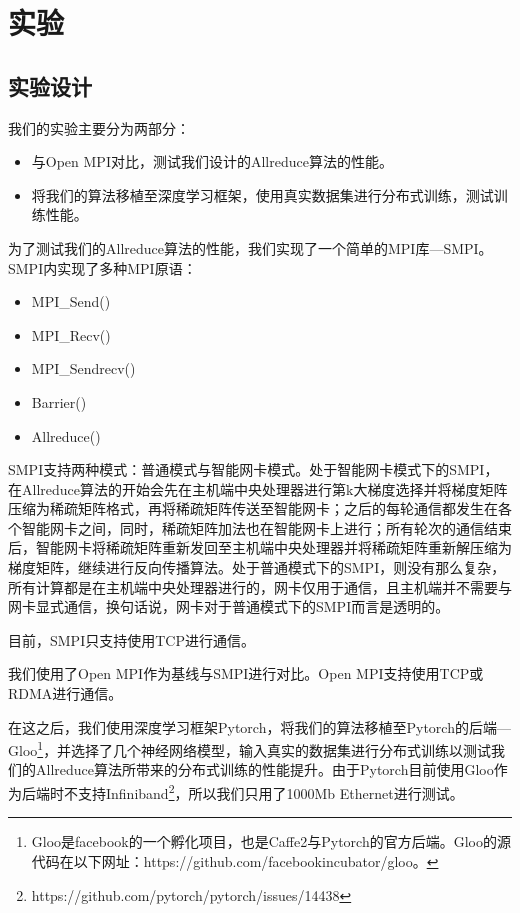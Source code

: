\chapter{实验}
\label{chap4}

\section{实验设计}
我们的实验主要分为两部分：
\begin{itemize}
    \item 与Open MPI对比，测试我们设计的Allreduce算法的性能。
    \item 将我们的算法移植至深度学习框架，使用真实数据集进行分布式训练，测试训练性能。
\end{itemize}

为了测试我们的Allreduce算法的性能，我们实现了一个简单的MPI库---SMPI。SMPI内实现了多种MPI原语：
\begin{itemize}
    \item MPI\_Send()
    \item MPI\_Recv()
    \item MPI\_Sendrecv()
    \item Barrier()
    \item Allreduce()
\end{itemize}

SMPI支持两种模式：普通模式与智能网卡模式。处于智能网卡模式下的SMPI，在Allreduce算法的开始会先在主机端中央处理器进行第k大梯度选择并将梯度矩阵压缩为稀疏矩阵格式，再将稀疏矩阵传送至智能网卡；之后的每轮通信都发生在各个智能网卡之间，同时，稀疏矩阵加法也在智能网卡上进行；所有轮次的通信结束后，智能网卡将稀疏矩阵重新发回至主机端中央处理器并将稀疏矩阵重新解压缩为梯度矩阵，继续进行反向传播算法。处于普通模式下的SMPI，则没有那么复杂，所有计算都是在主机端中央处理器进行的，网卡仅用于通信，且主机端并不需要与网卡显式通信，换句话说，网卡对于普通模式下的SMPI而言是透明的。

目前，SMPI只支持使用TCP进行通信。

我们使用了Open MPI作为基线与SMPI进行对比。Open MPI支持使用TCP或RDMA进行通信。

在这之后，我们使用深度学习框架Pytorch，将我们的算法移植至Pytorch的后端---Gloo\footnote{Gloo是facebook的一个孵化项目，也是Caffe2与Pytorch的官方后端。Gloo的源代码在以下网址：https://github.com/facebookincubator/gloo。}，并选择了几个神经网络模型，输入真实的数据集进行分布式训练以测试我们的Allreduce算法所带来的分布式训练的性能提升。由于Pytorch目前使用Gloo作为后端时不支持Infiniband\footnote{https://github.com/pytorch/pytorch/issues/14438}，所以我们只用了1000Mb Ethernet进行测试。

